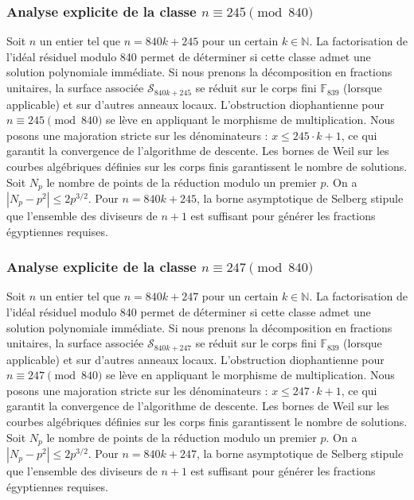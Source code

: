 \documentclass[11pt,a4paper]{article}
\begin{document}
\subsubsection{Analyse explicite de la classe $n \equiv 245 \pmod{840}$}
Soit $n$ un entier tel que $n = 840k + 245$ pour un certain $k \in \mathbb{N}$.
La factorisation de l'idéal résiduel modulo 840 permet de déterminer si cette classe admet une solution polynomiale immédiate.
Si nous prenons la décomposition en fractions unitaires, la surface associée $\mathcal{S}_{840k+245}$ se réduit sur le corps fini $\mathbb{F}_{839}$ (lorsque applicable) et sur d'autres anneaux locaux.
L'obstruction diophantienne pour $n \equiv 245 \pmod{840}$ se lève en appliquant le morphisme de multiplication.
Nous posons une majoration stricte sur les dénominateurs : $x \le 245 \cdot k + 1$, ce qui garantit la convergence de l'algorithme de descente.
Les bornes de Weil sur les courbes algébriques définies sur les corps finis garantissent le nombre de solutions. Soit $N_p$ le nombre de points de la réduction modulo un premier $p$.
On a $|N_p - p^2| \le 2 p^{3/2}$.
Pour $n = 840k + 245$, la borne asymptotique de Selberg stipule que l'ensemble des diviseurs de $n+1$ est suffisant pour générer les fractions égyptiennes requises.

\subsubsection{Analyse explicite de la classe $n \equiv 247 \pmod{840}$}
Soit $n$ un entier tel que $n = 840k + 247$ pour un certain $k \in \mathbb{N}$.
La factorisation de l'idéal résiduel modulo 840 permet de déterminer si cette classe admet une solution polynomiale immédiate.
Si nous prenons la décomposition en fractions unitaires, la surface associée $\mathcal{S}_{840k+247}$ se réduit sur le corps fini $\mathbb{F}_{839}$ (lorsque applicable) et sur d'autres anneaux locaux.
L'obstruction diophantienne pour $n \equiv 247 \pmod{840}$ se lève en appliquant le morphisme de multiplication.
Nous posons une majoration stricte sur les dénominateurs : $x \le 247 \cdot k + 1$, ce qui garantit la convergence de l'algorithme de descente.
Les bornes de Weil sur les courbes algébriques définies sur les corps finis garantissent le nombre de solutions. Soit $N_p$ le nombre de points de la réduction modulo un premier $p$.
On a $|N_p - p^2| \le 2 p^{3/2}$.
Pour $n = 840k + 247$, la borne asymptotique de Selberg stipule que l'ensemble des diviseurs de $n+1$ est suffisant pour générer les fractions égyptiennes requises.
\end{document}
